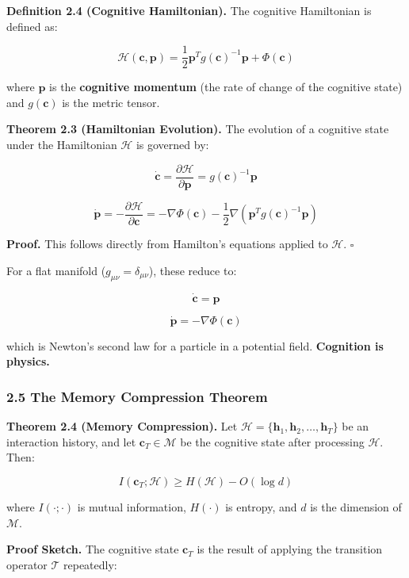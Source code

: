\documentclass[
  11pt,
  a4paper,
]{article}
\begin{document}
\textbf{Definition 2.4 (Cognitive Hamiltonian).} The cognitive
Hamiltonian is defined as:

\[\mathcal{H}(\mathbf{c}, \mathbf{p}) = \frac{1}{2} \mathbf{p}^T g(\mathbf{c})^{-1} \mathbf{p} + \Phi(\mathbf{c})\]

where \(\mathbf{p}\) is the \textbf{cognitive momentum} (the rate of
change of the cognitive state) and \(g(\mathbf{c})\) is the metric
tensor.

\textbf{Theorem 2.3 (Hamiltonian Evolution).} The evolution of a
cognitive state under the Hamiltonian \(\mathcal{H}\) is governed by:

\[\dot{\mathbf{c}} = \frac{\partial \mathcal{H}}{\partial \mathbf{p}} = g(\mathbf{c})^{-1} \mathbf{p}\]

\[\dot{\mathbf{p}} = -\frac{\partial \mathcal{H}}{\partial \mathbf{c}} = -\nabla \Phi(\mathbf{c}) - \frac{1}{2} \nabla \left( \mathbf{p}^T g(\mathbf{c})^{-1} \mathbf{p} \right)\]

\textbf{Proof.} This follows directly from Hamilton's equations applied
to \(\mathcal{H}\). \(\square\)

For a flat manifold (\(g_{\mu\nu} = \delta_{\mu\nu}\)), these reduce to:

\[\dot{\mathbf{c}} = \mathbf{p}\]

\[\dot{\mathbf{p}} = -\nabla \Phi(\mathbf{c})\]

which is Newton's second law for a particle in a potential field.
\textbf{Cognition is physics.}

\subsubsection{2.5 The Memory Compression
Theorem}\label{the-memory-compression-theorem}

\textbf{Theorem 2.4 (Memory Compression).} Let
\(\mathcal{H} = \{\mathbf{h}_1, \mathbf{h}_2, \dots, \mathbf{h}_T\}\) be
an interaction history, and let \(\mathbf{c}_T \in \mathcal{M}\) be the
cognitive state after processing \(\mathcal{H}\). Then:

\[I(\mathbf{c}_T; \mathcal{H}) \geq H(\mathcal{H}) - O(\log d)\]

where \(I(\cdot; \cdot)\) is mutual information, \(H(\cdot)\) is
entropy, and \(d\) is the dimension of \(\mathcal{M}\).

\textbf{Proof Sketch.} The cognitive state \(\mathbf{c}_T\) is the
result of applying the transition operator \(\mathcal{T}\) repeatedly:
\end{document}
